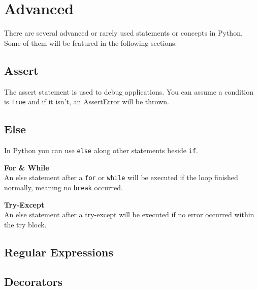 \section{Advanced}
    
    There are several advanced or rarely used statements or concepts in Python.
    Some of them will be featured in the following sections:

    \subsection{Assert}
        The assert statement is used to debug applications.
        You can assume a condition is \texttt{True} and if it isn't,
        an AssertError will be thrown.


    \subsection{Else}

        In Python you can use \texttt{else} along other statements beside
        \texttt{if}.

        \begin{indentblock}

            \textbf{For \& While} \\
            An else statement after a \texttt{for} or \texttt{while}
            will be executed if the loop finished normally, meaning no \texttt{break}
            occurred.

            \textbf{Try-Except} \\
            An else statement after a try-except will be executed if no error occurred within the try block.

        \end{indentblock}

    \subsection{Regular Expressions}

    \subsection{Decorators}
